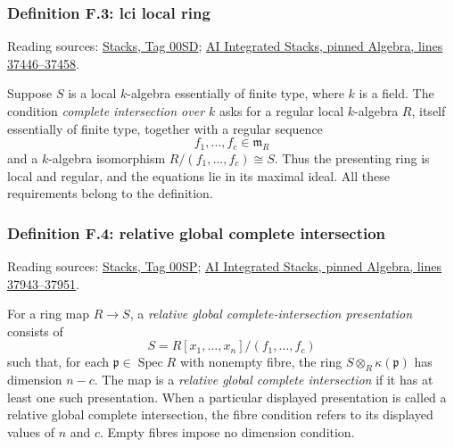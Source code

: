 \documentclass[11pt,a4paper,openany]{report}
\newcounter{none}
\begin{document}
\label{AG-RG-S05-algebra-definition-lci-local-ring}

\subsubsection{Definition F.3: lci local ring}\label{AG-RG-S05-definition-f.3-lci-local-ring}

Reading sources: \href{https://stacks.math.columbia.edu/tag/00SD}{Stacks, Tag 00SD}; \href{https://github.com/KokunoYumeto/unofficial-stacks-project-ai-drafts/blob/565b10e987aba5969b21145a0833f42d69f96790/algebra.tex\#L37446-L37458}{AI Integrated Stacks, pinned Algebra, lines 37446--37458}.

Suppose \(S\) is a local \(k\)-algebra essentially of finite type, where \(k\) is a field. The condition \emph{complete intersection over \(k\)} asks for a regular local \(k\)-algebra \(R\), itself essentially of finite type, together with a regular sequence \[f_1,\ldots,f_c\in\mathfrak m_R\] and a \(k\)-algebra isomorphism \(R/(f_1,\ldots,f_c)\cong S\). Thus the presenting ring is local and regular, and the equations lie in its maximal ideal. All these requirements belong to the definition.

\label{AG-RG-S05-algebra-definition-relative-global-complete-intersection}

\subsubsection{Definition F.4: relative global complete intersection}\label{AG-RG-S05-definition-f.4-relative-global-complete-intersection}

Reading sources: \href{https://stacks.math.columbia.edu/tag/00SP}{Stacks, Tag 00SP}; \href{https://github.com/KokunoYumeto/unofficial-stacks-project-ai-drafts/blob/565b10e987aba5969b21145a0833f42d69f96790/algebra.tex\#L37943-L37951}{AI Integrated Stacks, pinned Algebra, lines 37943--37951}.

For a ring map \(R\to S\), a \emph{relative global complete-intersection presentation} consists of \[S=R[x_1,\ldots,x_n]/(f_1,\ldots,f_c)\] such that, for each \(\mathfrak p\in\operatorname{Spec}R\) with nonempty fibre, the ring \(S\otimes_R\kappa(\mathfrak p)\) has dimension \(n-c\). The map is a \emph{relative global complete intersection} if it has at least one such presentation. When a particular displayed presentation is called a relative global complete intersection, the fibre condition refers to its displayed values of \(n\) and \(c\). Empty fibres impose no dimension condition.
\end{document}
